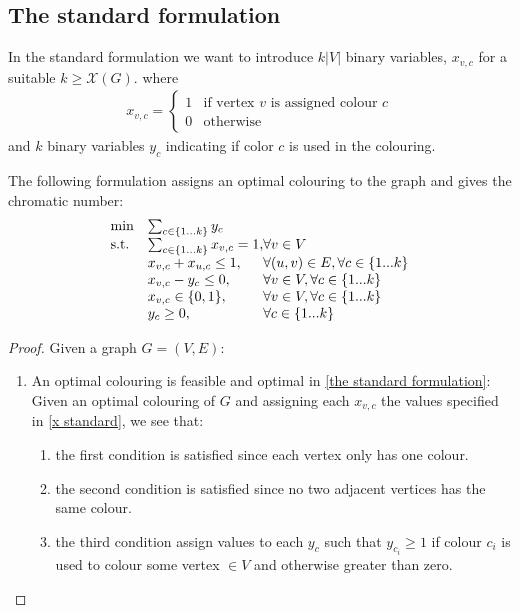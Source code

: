 \subsection{The standard formulation}
In the standard formulation we want to introduce $k|V|$ binary variables, $x_{v,c}$ for a suitable $k\geq \mathcal{X}(G)$. where
\begin{align} \label{x standard}
x_{v,c} = \left\{
\begin{array}{ll}
1 & \text{if vertex }v \text{ is assigned colour } c \\ 0 & \text{otherwise}
\end{array}\right.
\end{align}
and $k$ binary variables $y_c$ indicating if color $c$ is used in the colouring.\\
\begin{proposition}
The following formulation assigns an optimal colouring to the graph and gives the chromatic number:
\begin{align}\label{the standard formulation}
\begin{array}{ll@{}ll}
\text{min} &\sum_{c\in \{1...k\}} y_c&\\
\text{s.t.} 
&\sum_{c\in \{1...k\}}{x_{v,c}} = 1,& \forall v \in V\\
&x_{v,c} + x_{u,c} \leq 1,& \forall (u,v)\in E, \forall c \in \{1...k\}\\
&x_{v,c} - y_c \leq 0,& \forall v \in V,\forall c \in \{1...k\}\\
&x_{v,c}\in\{0,1\},& \forall v \in V, \forall c \in \{1...k\}\\
&y_c \geq 0,& \forall c \in \{1...k\}\\
\end{array}
\end{align}
\begin{proof}
Given a graph $G = (V,E)$:
\begin{enumerate}
\item An optimal colouring is feasible and optimal in \ref{the standard formulation}:\\
Given an optimal colouring of $G$ and assigning each $x_{v,c}$ the values specified in \ref{x standard}, we see that:
\begin{enumerate}
\item the first condition is satisfied since each vertex only has one colour.
\item the second condition is satisfied since no two adjacent vertices has the same colour.
\item the third condition assign values to each $y_c$ such that $y_{c_i} \geq 1$ if colour $c_i$ is used to colour some vertex $\in V$ and otherwise greater than zero.

\end{enumerate}
\end{enumerate}
\end{proof}
\end{proposition}
